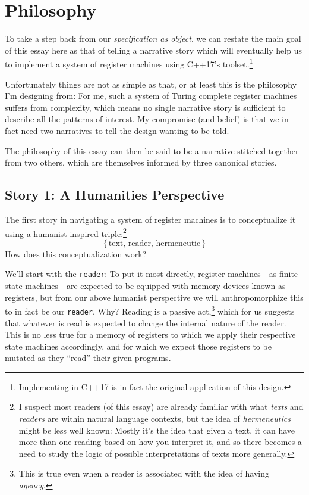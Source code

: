 \documentclass[twoside]{article}
\newcommand{\pdfnote}[1]{\:\footnote{#1}}
\begin{document}
\section*{Philosophy}

To take a step back from our \emph{specification as object}, we can restate the main goal of this essay here as that
of telling a narrative story which will eventually help us to implement a system of register machines using C++17's
toolset.\pdfnote{Implementing in C++17 is in fact the original application of this design.}

Unfortunately things are not as simple as that, or at least this is the philosophy I'm designing from: For me,
such a system of Turing complete register machines suffers from complexity, which means no single narrative story
is sufficient to describe all the patterns of interest. My compromise (and belief) is that we in fact need two
narratives to tell the design wanting to be told.

The philosophy of this essay can then be said to be a narrative stitched together from two others, which are themselves
informed by three canonical stories.

\subsection*{Story 1: A Humanities Perspective}

The first story in navigating a system of register machines is to conceptualize it using a humanist inspired
triple:\pdfnote{I suspect most readers (of this essay) are already familiar with what \emph{texts} and \emph{readers}
are within natural language contexts, but the idea of \emph{hermeneutics} might be less well known: Mostly it's the idea
that given a text, it can have more than one reading based on how you interpret it, and so there becomes a need to study
the logic of possible interpretations of texts more generally.}
$$ \{\,\mbox{text, reader, hermeneutic}\,\} $$
How does this conceptualization work?

We'll start with the \texttt{reader}: To put it most directly, register machines---as finite state machines---are expected
to be equipped with memory devices known as registers, but from our above humanist perspective we will anthropomorphize
this to in fact be our \texttt{reader}. Why? Reading is a passive act,\pdfnote{This is true even when a reader is associated
with the idea of having \emph{agency}.} which for us suggests that whatever is read is expected to change the internal
nature of the reader. This is no less true for a memory of registers to which we apply their respective state machines
accordingly, and for which we expect those registers to be mutated as they ``read'' their given programs.
\end{document}
